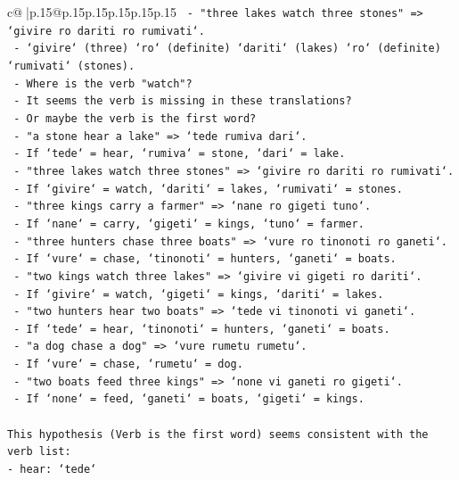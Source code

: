 \documentclass{article}
\begin{document}
{\begin{supertabular}{c@{$\;$}|p{.15\linewidth}@{}p{.15\linewidth}p{.15\linewidth}p{.15\linewidth}p{.15\linewidth}p{.15\linewidth}}
{{{\texttt{  {-} "three lakes watch three stones" => `givire ro dariti ro rumivati`.} \\
\texttt{  {-} `givire` (three) `ro` (definite) `dariti` (lakes) `ro` (definite) `rumivati` (stones).} \\
\texttt{  {-} Where is the verb "watch"?} \\
\texttt{  {-} It seems the verb is missing in these translations?} \\
\texttt{  {-} Or maybe the verb is the first word?} \\
\texttt{  {-} "a stone hear a lake" => `tede rumiva dari`.} \\
\texttt{  {-} If `tede` = hear, `rumiva` = stone, `dari` = lake.} \\
\texttt{  {-} "three lakes watch three stones" => `givire ro dariti ro rumivati`.} \\
\texttt{  {-} If `givire` = watch, `dariti` = lakes, `rumivati` = stones.} \\
\texttt{  {-} "three kings carry a farmer" => `nane ro gigeti tuno`.} \\
\texttt{  {-} If `nane` = carry, `gigeti` = kings, `tuno` = farmer.} \\
\texttt{  {-} "three hunters chase three boats" => `vure ro tinonoti ro ganeti`.} \\
\texttt{  {-} If `vure` = chase, `tinonoti` = hunters, `ganeti` = boats.} \\
\texttt{  {-} "two kings watch three lakes" => `givire vi gigeti ro dariti`.} \\
\texttt{  {-} If `givire` = watch, `gigeti` = kings, `dariti` = lakes.} \\
\texttt{  {-} "two hunters hear two boats" => `tede vi tinonoti vi ganeti`.} \\
\texttt{  {-} If `tede` = hear, `tinonoti` = hunters, `ganeti` = boats.} \\
\texttt{  {-} "a dog chase a dog" => `vure rumetu rumetu`.} \\
\texttt{  {-} If `vure` = chase, `rumetu` = dog.} \\
\texttt{  {-} "two boats feed three kings" => `none vi ganeti ro gigeti`.} \\
\texttt{  {-} If `none` = feed, `ganeti` = boats, `gigeti` = kings.} \\
\\ 
\texttt{This hypothesis (Verb is the first word) seems consistent with the verb list:} \\
\texttt{{-} hear: `tede`} \\
}}}
\end{supertabular}}
\end{document}
